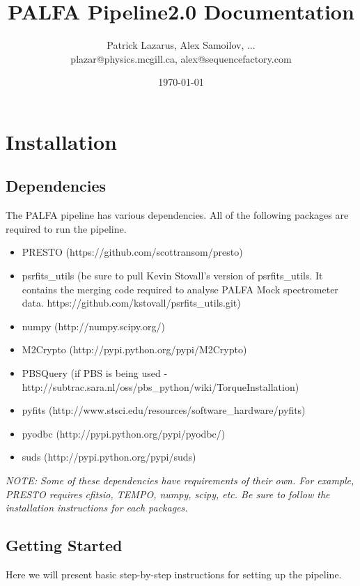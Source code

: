


\title{PALFA Pipeline2.0 Documentation}
\author{Patrick Lazarus, Alex Samoilov, ... \\
        plazar@physics.mcgill.ca, alex@sequencefactory.com}
\date{\today}

\maketitle

\begin{abstract}
\end{abstract}

\section{Installation}
\subsection{Dependencies}
The PALFA pipeline has various dependencies. All of the following packages are required to run the pipeline.
\begin{itemize}
    \item PRESTO (https://github.com/scottransom/presto)
    \item psrfits\_utils (be sure to pull Kevin Stovall's version of psrfits\_utils. It contains the merging code required to analyse PALFA Mock spectrometer data. https://github.com/kstovall/psrfits\_utils.git)
    \item numpy (http://numpy.scipy.org/)
    \item M2Crypto (http://pypi.python.org/pypi/M2Crypto)
    \item PBSQuery (if PBS is being used - http://subtrac.sara.nl/oss/pbs\_python/wiki/TorqueInstallation)
    \item pyfits (http://www.stsci.edu/resources/software\_hardware/pyfits)
    \item pyodbc (http://pypi.python.org/pypi/pyodbc/)
    \item suds (http://pypi.python.org/pypi/suds)
\end{itemize}

\textit{NOTE: Some of these dependencies have requirements of their own. For example, PRESTO requires cfitsio, TEMPO, numpy, scipy, etc. Be sure to follow the installation instructions for each packages.}

\subsection{Getting Started}
Here we will present basic step-by-step instructions for setting up the pipeline.


